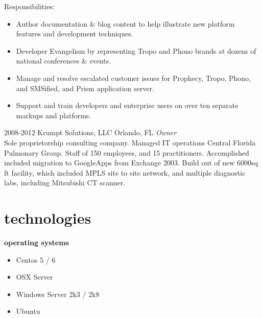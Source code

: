 \documentclass[]{friggeri-cv} %
\begin{document}
\begin{entrylist}
{      Responsibilities:
      \begin{itemize}
        \item Author documentation \& blog content to help illustrate new platform features and development techniques.
        \item Developer Evangelism by representing Tropo and Phono brands at dozens of national conferences \& events.
        \item Manage and resolve escalated customer issues for Prophecy, Tropo, Phono, and SMSified, and Prism application server.
        \item Support and train developers and enterprise users on over ten separate markups and platforms.
      \end{itemize}}

    \entry
      {2008-2012}
      {Krumpt Solutions, LLC}
      {Orlando, FL}
      {\emph{Owner} \\
      Sole proprietorship consulting company.  Managed IT operations Central Florida Pulmonary Group.  Staff of 150 employees, and 15 practitioners.  Accomplished included migration to GoogleApps from  Exchange 2003. Build out of new 6000sq ft facility, which included MPLS site to site network, and multiple diagnostic labs, including Mitsubishi CT scanner.}

\end{entrylist}


\section{technologies}

  \textbf{operating systems}
    \begin{multicols}{3}
      \begin{itemize}
        \item Centos 5 / 6
        \item OSX Server
        \item Windows Server 2k3 / 2k8
        \item Ubuntu
      \end{itemize}
    \end{multicols}
\end{document}
